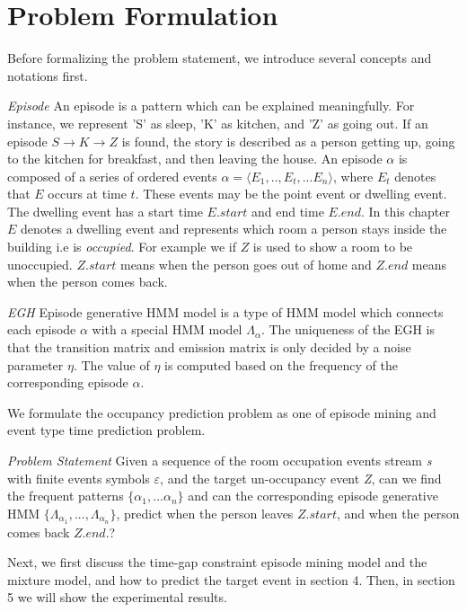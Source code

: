 \section{Problem Formulation}
Before formalizing the problem statement, 
we introduce several concepts and notations first. 

\textit{Episode} An episode is a pattern which can be explained meaningfully. For instance, we represent 'S' as sleep, 
'K' as kitchen, and 'Z' as going out. 
If an episode $S \rightarrow K \rightarrow Z$ is found, 
the story is described as a person getting up, 
going to the kitchen for breakfast, and then leaving the house. 
An episode $\alpha$ is composed 
of a series of ordered events
$\alpha=\langle E_1,..,E_t,...E_n \rangle$, 
where $E_t$ denotes that $E$ occurs at time $t$.  
These events may be the point event or dwelling event. 
The dwelling event
has a start time $E.start$ and end time $E.end$. 
In this chapter  $E$ denotes a dwelling event and 
represents which room a person stays 
inside the building i.e is \emph{occupied}. 
For example we if $Z$ is used to show a room to be unoccupied. 
$Z.start$ means when the person goes out of home and 
$Z.end$ means when the person comes back. 

\textit{EGH} Episode generative HMM model is a 
type of HMM model which connects each episode $\alpha$ 
with a special HMM model $\Lambda_\alpha$. 
The uniqueness of the EGH is that 
the transition matrix and 
emission matrix is only decided by a noise parameter $\eta$. 
The value of $\eta$ is computed based on the frequency of the 
corresponding episode $\alpha$. 

We formulate the occupancy prediction problem as one of 
episode mining and event type time prediction problem. 

\textit{Problem Statement} Given a sequence of the room occupation 
events stream \textit{s} with finite events symbols $\varepsilon$, 
and the target un-occupancy event \textit{Z}, can we
find the frequent patterns $\{\alpha_1,...\alpha_n\}$ 
and can the corresponding episode generative HMM 
$\{\Lambda_{\alpha_1}, ..., \Lambda_{\alpha_n}\}$, 
predict when 
the person leaves $Z.{start}$, 
and when the person comes back $Z.{end}$.?

Next, 
we first discuss the time-gap constraint episode mining 
model and the mixture model, 
and how to predict the target event in section 4. 
Then, 
in section 5 we will show 
the experimental results. 

\iffalse
The training phase is to mine the frequent episodes and connect it with HMM model
as described in \cite{laxman2008stream}. We modify the constraints during episode mining
and keeps the connections between the frequent episodes and HMM the same. 
The training algorithm describes in Algorithm \ref{alg1}.
\fi

